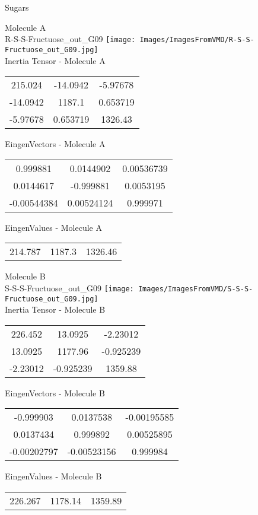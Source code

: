 \vtab[-2cm]
\begin{center}
{\large Sugars}
\end{center}
\begin{multicols}{2}
\begin{center}
Molecule A \\ 
R-S-S-Fructuose\_out\_G09
\texttt{[image: Images/ImagesFromVMD/R-S-S-Fructuose\_out\_G09.jpg]}
\\
Inertia Tensor - Molecule A \\
\vtab
\begin{tabular}{|c c c|}
215.024	 & 	-14.0942	 & 	-5.97678	 \\
-14.0942	 & 	1187.1	 & 	0.653719	 \\
-5.97678	 & 	0.653719	 & 	1326.43
\end{tabular}

\vtab
 EingenVectors - Molecule A     \\
\vtab
\begin{tabular}{|c c c|}
0.999881	 & 	0.0144902	 & 	0.00536739	 \\
0.0144617	 & 	-0.999881	 & 	0.0053195	 \\
-0.00544384	 & 	0.00524124	 & 	0.999971
\end{tabular}

\vtab
 EingenValues - Molecule A     \\
\vtab
\begin{tabular}{|c c c|}
214.787	 & 	1187.3	 & 	1326.46
\end{tabular}
\columnbreak

Molecule B \\ 
S-S-S-Fructuose\_out\_G09
\texttt{[image: Images/ImagesFromVMD/S-S-S-Fructuose\_out\_G09.jpg]}
\\
Inertia Tensor - Molecule B \\
\vtab
\begin{tabular}{|c c c|}
226.452	 & 	13.0925	 & 	-2.23012	 \\
13.0925	 & 	1177.96	 & 	-0.925239	 \\
-2.23012	 & 	-0.925239	 & 	1359.88
\end{tabular}

\vtab
 EingenVectors - Molecule B     \\
\vtab
\begin{tabular}{|c c c|}
-0.999903	 & 	0.0137538	 & 	-0.00195585	 \\
0.0137434	 & 	0.999892	 & 	0.00525895	 \\
-0.00202797	 & 	-0.00523156	 & 	0.999984
\end{tabular}

\vtab
 EingenValues - Molecule B     \\
\vtab
\begin{tabular}{|c c c|}
226.267	 & 	1178.14	 & 	1359.89
\end{tabular}

\end{center}
\end{multicols}
